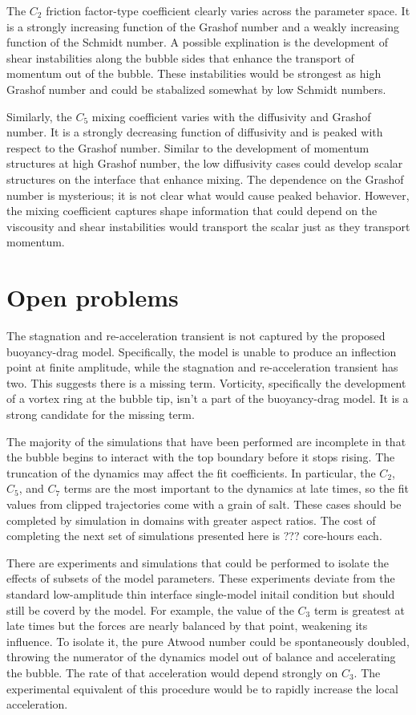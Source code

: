 The $C_2$ friction factor-type coefficient clearly varies across the parameter space.
It is a strongly increasing function of the Grashof number and a weakly increasing function of the Schmidt number.
A possible explination is the development of shear instabilities along the bubble sides that enhance the transport of momentum out of the bubble.
These instabilities would be strongest as high Grashof number and could be stabalized somewhat by low Schmidt numbers.

Similarly, the $C_5$ mixing coefficient varies with the diffusivity and Grashof number.
It is a strongly decreasing function of diffusivity and is peaked with respect to the Grashof number.
Similar to the development of momentum structures at high Grashof number, the low diffusivity cases could develop scalar structures on the interface that enhance mixing.
The dependence on the Grashof number is mysterious; it is not clear what would cause peaked behavior.
However, the mixing coefficient captures shape information that could depend on the viscousity and shear instabilities would transport the scalar just as they transport momentum.


\section{Open problems}

The stagnation and re-acceleration transient is not captured by the proposed buoyancy-drag model.
Specifically, the model is unable to produce an inflection point at finite amplitude, while the stagnation and re-acceleration transient has two.
This suggests there is a missing term.
Vorticity, specifically the development of a vortex ring at the bubble tip, isn't a part of the buoyancy-drag model.
It is a strong candidate for the missing term.

The majority of the simulations that have been performed are incomplete in that the bubble begins to interact with the top boundary before it stops rising.
The truncation of the dynamics may affect the fit coefficients.
In particular, the $C_2$, $C_5$, and $C_7$ terms are the most important to the dynamics at late times, so the fit values from clipped trajectories come with a grain of salt.
These cases should be completed by simulation in domains with greater aspect ratios.
The cost of completing the next set of simulations presented here is ??? core-hours each.

There are experiments and simulations that could be performed to isolate the effects of subsets of the model parameters.
These experiments deviate from the standard low-amplitude thin interface single-model initail condition but should still be coverd by the model.
For example, the value of the $C_3$ term is greatest at late times but the forces are nearly balanced by that point, weakening its influence.
To isolate it, the pure Atwood number could be spontaneously doubled, throwing the numerator of the dynamics model out of balance and accelerating the bubble.
The rate of that acceleration would depend strongly on $C_3$.
The experimental equivalent of this procedure would be to rapidly increase the local acceleration.




